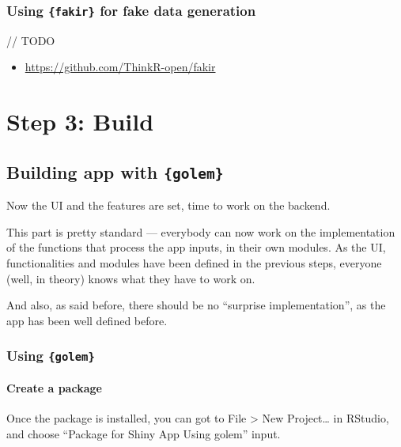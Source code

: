 \documentclass[]{book}
\providecommand{\tightlist}{%
  \setlength{\itemsep}{0pt}\setlength{\parskip}{0pt}}
\begin{document}
\hypertarget{using-fakir-for-fake-data-generation}{%
\section{\texorpdfstring{Using \texttt{\{fakir\}} for fake data generation}{Using \{fakir\} for fake data generation}}\label{using-fakir-for-fake-data-generation}}

// TODO

\begin{itemize}
\tightlist
\item
  \url{https://github.com/ThinkR-open/fakir}
\end{itemize}

\hypertarget{part-step-3-build}{%
\part{Step 3: Build}\label{part-step-3-build}}

\hypertarget{stepbuild}{%
\chapter{\texorpdfstring{Building app with \texttt{\{golem\}}}{Building app with \{golem\}}}\label{stepbuild}}

Now the UI and the features are set, time to work on the backend.

This part is pretty standard --- everybody can now work on the implementation of the functions that process the app inputs, in their own modules. As the UI, functionalities and modules have been defined in the previous steps, everyone (well, in theory) knows what they have to work on.

And also, as said before, there should be no ``surprise implementation'', as the app has been well defined before.

\hypertarget{using-golem}{%
\section{\texorpdfstring{Using \texttt{\{golem\}}}{Using \{golem\}}}\label{using-golem}}

\hypertarget{create-a-package}{%
\subsection{Create a package}\label{create-a-package}}

Once the package is installed, you can got to File \textgreater{} New Project\ldots{} in RStudio, and choose ``Package for Shiny App Using golem'' input.
\end{document}
